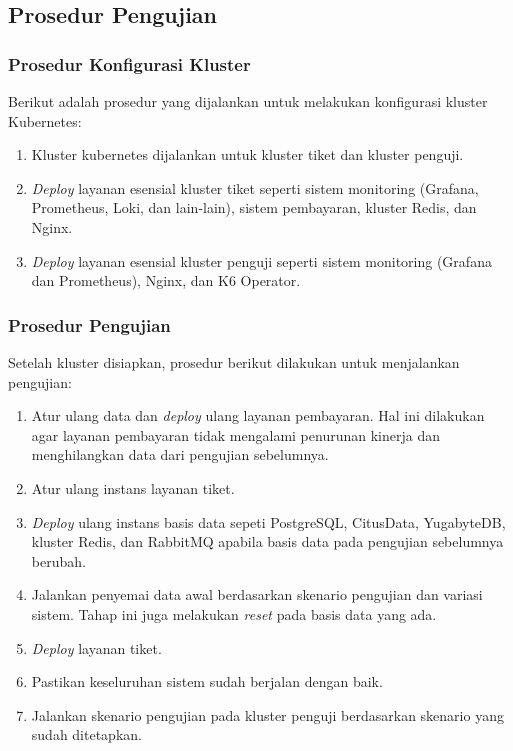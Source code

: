 \subsection{Prosedur Pengujian}

\subsubsection{Prosedur Konfigurasi Kluster}

Berikut adalah prosedur yang dijalankan untuk melakukan konfigurasi kluster Kubernetes:

\begin{enumerate}
    \item Kluster kubernetes dijalankan untuk kluster tiket dan kluster penguji.
    \item \textit{Deploy} layanan esensial kluster tiket seperti sistem monitoring (Grafana, Prometheus, Loki, dan lain-lain), sistem pembayaran, kluster Redis, dan Nginx.
    \item \textit{Deploy} layanan esensial kluster penguji seperti sistem monitoring (Grafana dan Prometheus), Nginx, dan K6 Operator.
\end{enumerate}

\subsubsection{Prosedur Pengujian}

Setelah kluster disiapkan, prosedur berikut dilakukan untuk menjalankan pengujian:

\begin{enumerate}
    \item Atur ulang data dan \textit{deploy} ulang layanan pembayaran. Hal ini dilakukan agar layanan pembayaran tidak mengalami penurunan kinerja dan menghilangkan data dari pengujian sebelumnya.
    \item Atur ulang instans layanan tiket.
    \item \textit{Deploy} ulang instans basis data sepeti PostgreSQL, CitusData, YugabyteDB, kluster Redis, dan RabbitMQ apabila basis data pada pengujian sebelumnya berubah.
    \item Jalankan penyemai data awal berdasarkan skenario pengujian dan variasi sistem. Tahap ini juga melakukan \textit{reset} pada basis data yang ada.
    \item \textit{Deploy} layanan tiket.
    \item Pastikan keseluruhan sistem sudah berjalan dengan baik.
    \item Jalankan skenario pengujian pada kluster penguji berdasarkan skenario yang sudah ditetapkan.
\end{enumerate}

